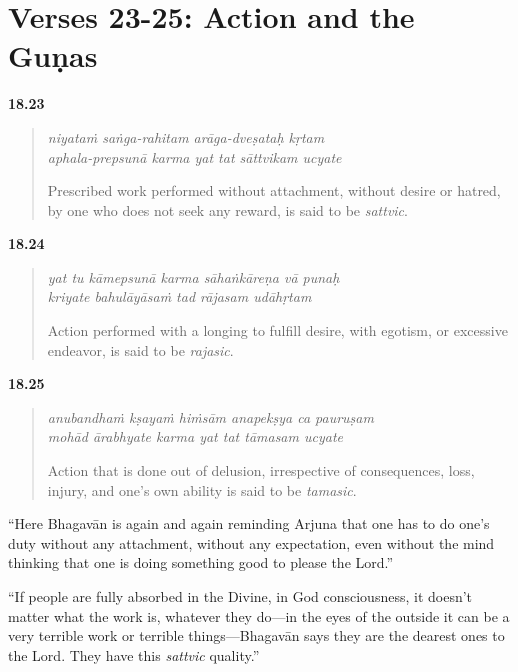 \section{Verses 23-25: Action and the Guṇas}\label{sec-verses-23-25-action-and-the-gunas}


\par\noindent\textbf{18.23}\par
\begin{verse}
\textit{niyataṁ saṅga-rahitam arāga-dveṣataḥ kṛtam} \\
\textit{aphala-prepsunā karma yat tat sāttvikam ucyate}

\noindent Prescribed work performed without attachment, without desire or hatred, by one who does not seek any reward, is said to be \textit{sattvic}.
\end{verse}
\par



\par\noindent\textbf{18.24}\par
\begin{verse}
\textit{yat tu kāmepsunā karma sāhaṅkāreṇa vā punaḥ} \\
\textit{kriyate bahulāyāsaṁ tad rājasam udāhṛtam}

\noindent Action performed with a longing to fulfill desire, with egotism, or excessive endeavor, is said to be \textit{rajasic}.
\end{verse}
\par



\par\noindent\textbf{18.25}\par
\begin{verse}
\textit{anubandhaṁ kṣayaṁ hiṁsām anapekṣya ca pauruṣam} \\
\textit{mohād ārabhyate karma yat tat tāmasam ucyate}

\noindent Action that is done out of delusion, irrespective of consequences, loss, injury, and one's own ability is said to be \textit{tamasic}.
\end{verse}
\par


\enquote{Here Bhagavān is again and again reminding Arjuna that one has to do one’s duty without any attachment, without any expectation, even without the mind thinking that one is doing something good to please the Lord.}

\enquote{If people are fully absorbed in the Divine, in God consciousness, it doesn’t matter what the work is, whatever they do---in the eyes of the outside it can be a very terrible work or terrible things---Bhagavān says they are the dearest ones to the Lord. They have this \textit{sattvic} quality.}

